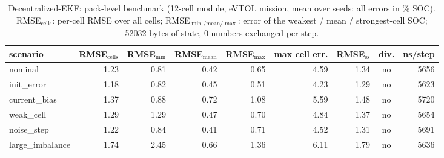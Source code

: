 \begin{table}[H]\centering\footnotesize\setlength{\tabcolsep}{4pt}\caption{Decentralized-EKF: pack-level benchmark (12-cell module, eVTOL mission, mean over seeds; all errors in \% SOC). RMSE$_\mathrm{cells}$: per-cell RMSE over all cells; RMSE$_{\min/\mathrm{mean}/\max}$: error of the weakest / mean / strongest-cell SOC; 52032 bytes of state, 0 numbers exchanged per step.}\label{tab:pack_DecentralizedEKF}
\begin{tabular}{lrrrrrrcr}\toprule scenario & RMSE$_\mathrm{cells}$ & RMSE$_{\min}$ & RMSE$_\mathrm{mean}$ & RMSE$_{\max}$ & max cell err. & RMSE$_\mathrm{ss}$ & div. & ns/step \\ \midrule
nominal & 1.23 & 0.81 & 0.42 & 0.65 & 4.59 & 1.34 & no & 5656 \\
init\_error & 1.18 & 0.82 & 0.45 & 0.51 & 4.23 & 1.29 & no & 5623 \\
current\_bias & 1.37 & 0.88 & 0.72 & 1.08 & 5.59 & 1.48 & no & 5720 \\
weak\_cell & 1.29 & 1.29 & 0.47 & 0.70 & 4.84 & 1.37 & no & 5654 \\
noise\_step & 1.22 & 0.84 & 0.41 & 0.71 & 4.52 & 1.31 & no & 5691 \\
large\_imbalance & 1.74 & 2.45 & 0.66 & 1.36 & 6.11 & 1.79 & no & 5636 \\
\bottomrule\end{tabular}\end{table}
